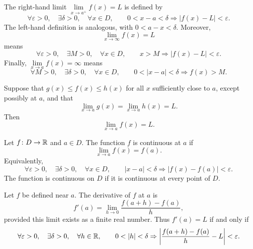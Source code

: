     \begin{definition}
        The right-hand limit $\lim\limits_{x\to a^+}f(x)=L$ is defined by
        \[
            \forall\varepsilon>0,
            \quad
            \exists\delta>0,
            \quad
            \forall x\in D,
            \qquad
            0<x-a<\delta
            \Rightarrow
            |f(x)-L|<\varepsilon.
        \]
        The left-hand definition is analogous, with $0<a-x<\delta$.
        Moreover,
        \[
            \lim\limits_{x\to\infty}f(x)=L
        \]
        means
        \[
            \forall\varepsilon>0,
            \quad
            \exists M>0,
            \quad
            \forall x\in D,
            \qquad
            x>M\Rightarrow |f(x)-L|<\varepsilon.
        \]
        Finally, $\lim\limits_{x\to a}f(x)=\infty$ means
        \[
            \forall M>0,
            \quad
            \exists\delta>0,
            \quad
            \forall x\in D,
            \qquad
            0<|x-a|<\delta\Rightarrow f(x)>M.
        \]
    \end{definition}

    \begin{theorem}
        Suppose that $g(x)\leq f(x)\leq h(x)$ for all $x$ sufficiently close
        to $a$, except possibly at $a$, and that
        \[
            \lim\limits_{x\to a}g(x)
            =
            \lim\limits_{x\to a}h(x)
            =L.
        \]
        Then
        \[
            \lim\limits_{x\to a}f(x)=L.
        \]
    \end{theorem}

    \begin{definition}
        Let $f\colon D\to\mathbb{R}$ and $a\in D$. The function $f$ is continuous at $a$ if
        \[
            \lim\limits_{x\to a}f(x)=f(a).
        \]
        Equivalently,
        \[
            \forall\varepsilon>0,
            \quad
            \exists\delta>0,
            \quad
            \forall x\in D,
            \qquad
            |x-a|<\delta
            \Rightarrow
            |f(x)-f(a)|<\varepsilon.
        \]
        The function is continuous on $D$ if it is continuous at every point of
        $D$.
    \end{definition}

    \begin{definition}[Derivative]
        Let $f$ be defined near $a$. The derivative of $f$ at $a$ is
        \[
            f'(a)
            =
            \lim\limits_{h\to 0}\frac{f(a+h)-f(a)}{h},
        \]
        provided this limit exists as a finite real number. Thus $f'(a)=L$ if
        and only if
        \[
            \forall\varepsilon>0,
            \quad
            \exists\delta>0,
            \quad
            \forall h\in\R,
            \qquad
            0<|h|<\delta
            \Rightarrow
            \left|
                \frac{f(a+h)-f(a)}{h}-L
            \right|<\varepsilon.
        \]
    \end{definition}

